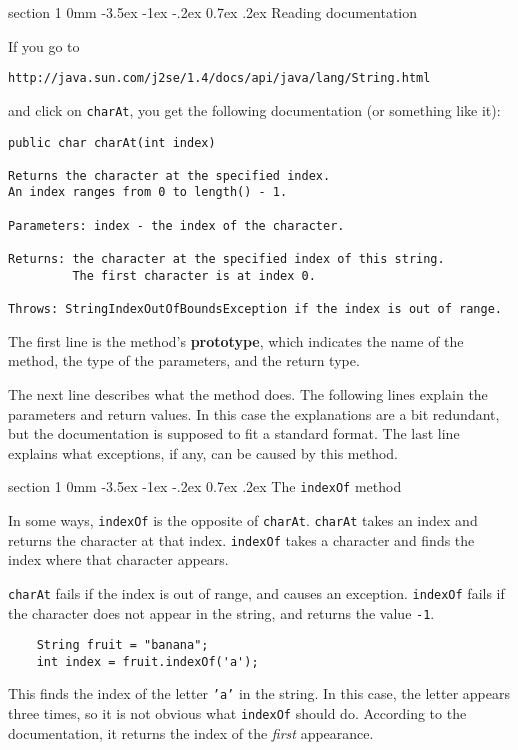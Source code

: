 \documentclass{book}
\makeatletter
\renewcommand{\section}{\@startsection 
    {section} {1} {0mm}%
    {-3.5ex \@plus -1ex \@minus -.2ex}%
    {0.7ex \@plus.2ex}%
    {\normalfont\Large\bfseries}}
\makeatother
\begin{document}
\section{Reading documentation}

If you go to

\begin{verbatim}
http://java.sun.com/j2se/1.4/docs/api/java/lang/String.html
\end{verbatim}
%
and click on {\tt charAt}, you get the following documentation
(or something like it):

\begin{verbatim}
public char charAt(int index)

Returns the character at the specified index.
An index ranges from 0 to length() - 1. 

Parameters: index - the index of the character. 

Returns: the character at the specified index of this string.
         The first character is at index 0. 

Throws: StringIndexOutOfBoundsException if the index is out of range.
\end{verbatim}
%
The first line is the method's {\bf prototype}, which indicates the
name of the method, the type of the parameters, and the return type.

The next line describes what the method does.  The following
lines explain the parameters and return values.  In this case
the explanations are a bit redundant, but the documentation is
supposed to fit a standard format.  The last line explains what
exceptions, if any, can be caused by this method.

\section{The {\tt indexOf} method}

In some ways, {\tt indexOf} is the opposite of {\tt charAt}.
{\tt charAt} takes an index and returns the character at that
index.  {\tt indexOf} takes a character and finds the index
where that character appears.

{\tt charAt} fails if the index is out of range, and causes an
exception.  {\tt indexOf} fails if the character does not appear in
the string, and returns the value {\tt -1}.

\begin{verbatim}
    String fruit = "banana";
    int index = fruit.indexOf('a');
\end{verbatim}
%
This finds the index of the letter {\tt 'a'} in the string.
In this case, the letter appears three times, so it is not
obvious what {\tt indexOf} should do.  According to the
documentation, it returns the index of the {\em first} appearance.
\end{document}
